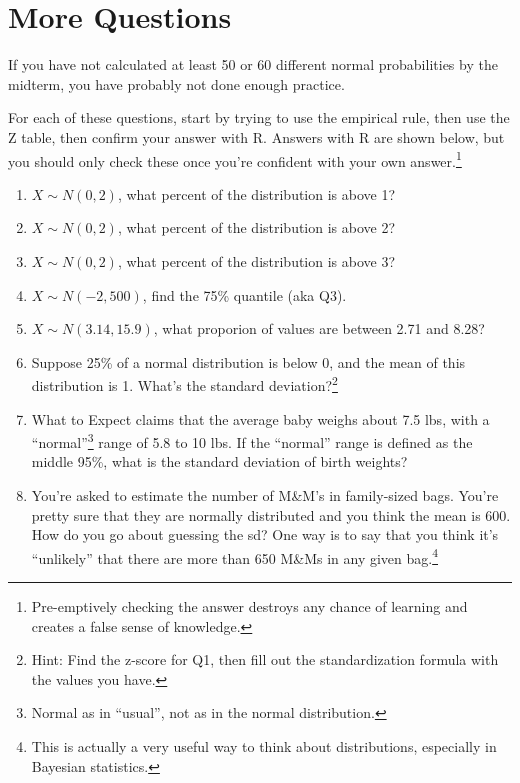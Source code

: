 \documentclass[
  letterpaper,
  DIV=11,
  numbers=noendperiod]{scrreprt}
\providecommand{\tightlist}{%
  \setlength{\itemsep}{0pt}\setlength{\parskip}{0pt}}\usepackage{longtable,booktabs,array}
\begin{document}
\hypertarget{more-questions}{%
\section{More Questions}\label{more-questions}}

If you have not calculated at least 50 or 60 different normal
probabilities by the midterm, you have probably not done enough
practice.

For each of these questions, start by trying to use the empirical rule,
then use the Z table, then confirm your answer with R. Answers with R
are shown below, but you should only check these once you're confident
with your own answer.\footnote{Pre-emptively checking the answer
  destroys any chance of learning and creates a false sense of
  knowledge.}

\begin{enumerate}
\def\labelenumi{\arabic{enumi}.}
\tightlist
\item
  \(X \sim N(0,2)\), what percent of the distribution is above 1?
\item
  \(X \sim N(0,2)\), what percent of the distribution is above 2?
\item
  \(X \sim N(0,2)\), what percent of the distribution is above 3?
\item
  \(X \sim N(-2, 500)\), find the 75\% quantile (aka Q3).
\item
  \(X \sim N(3.14, 15.9)\), what proporion of values are between 2.71
  and 8.28?
\item
  Suppose 25\% of a normal distribution is below 0, and the mean of this
  distribution is 1. What's the standard deviation?\footnote{Hint: Find
    the z-score for Q1, then fill out the standardization formula with
    the values you have.}
\item
  What to Expect claims that the average baby weighs about 7.5 lbs, with
  a ``normal''\footnote{Normal as in ``usual'', not as in the normal
    distribution.} range of 5.8 to 10 lbs. If the ``normal'' range is
  defined as the middle 95\%, what is the standard deviation of birth
  weights?
\item
  You're asked to estimate the number of M\&M's in family-sized bags.
  You're pretty sure that they are normally distributed and you think
  the mean is 600. How do you go about guessing the sd? One way is to
  say that you think it's ``unlikely'' that there are more than 650
  M\&Ms in any given bag.\footnote{This is actually a very useful way to
    think about distributions, especially in Bayesian statistics.}


\end{enumerate}
\end{document}
